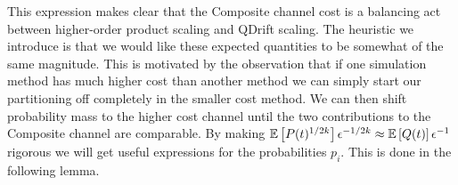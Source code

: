 This expression makes clear that the Composite channel cost is a balancing act between higher-order product scaling and QDrift scaling. The heuristic we introduce is that we would like these expected quantities to be somewhat of the same magnitude. This is motivated by the observation that if one simulation method has much higher cost than another method we can simply start our partitioning off completely in the smaller cost method. We can then shift probability mass to the higher cost channel until the two contributions to the Composite channel are comparable. By making $\mathbb{E}\left[ P(t)^{1/2k} \right] \epsilon^{-1/2k} \approx \mathbb{E}\left[ Q(t) \right] \epsilon^{-1}$ rigorous we will get useful expressions for the probabilities $p_i$. This is done in the following lemma. 
\assProb*
